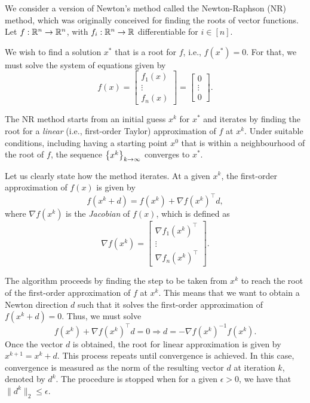 We consider a version of Newton's method called the Newton-Raphson (NR) method, which was originally conceived for finding the roots of vector functions. Let $f: \mathbb{R}^n \to \mathbb{R}^n$, with $f_i : \mathbb{R}^n \to \mathbb{R}$ differentiable for $i \in [n]$.

We wish to find a solution $x^*$ that is a root for $f$, i.e., $f(x^*) = 0$. For that, we must solve the system of equations given by
	$$ 
	f(x) = \begin{bmatrix} f_1(x) \\ \vdots \\ f_n(x) \end{bmatrix} = \begin{bmatrix} 0 \\ \vdots \\ 0 \end{bmatrix}.
	$$
	
The NR method starts from an initial guess $x^k$ for $x^*$ and iterates by finding the root for a \emph{linear} (i.e., first-order Taylor) approximation of $f$ at $x^k$. Under suitable conditions, including having a starting point $x^0$ that is within a neighbourhood of the root of $f$, the sequence $\left\{ x^k \right \}_{k\to\infty}$ converges to $x^*$.

Let us clearly state how the method iterates. At a given $x^k$, the first-order approximation of $f(x)$ is given by
	$$ 
	f(x^k + d) = f(x^k) + \nabla f(x^k)^\top d,
	$$
	where $\nabla f(x^k)$ is the \emph{Jacobian} of $f(x)$, which is defined as
	$$ 
	\nabla f(x^k) = \begin{bmatrix} \nabla f_1(x^k)^\top \\ \vdots \\ \nabla f_n(x^k)^\top \end{bmatrix}. 
	$$
	
The algorithm proceeds by finding the step to be taken from $x^k$ to reach the root of the first-order approximation of $f$ at $x^k$. This means that we want to obtain a Newton direction $d$ such that it solves the first-order approximation of $f(x^k + d) = 0$. Thus, we must solve
	\begin{equation*}
		f(x^k) + \nabla f(x^k)^\top d = 0 \Rightarrow
		d = -\nabla f(x^k)^{-1}f(x^k).
	\end{equation*}
	Once the vector $d$ is obtained, the root for linear approximation is given by $x^{k+1} = x^k + d$. This process repeats until convergence is achieved. In this case, convergence is measured as the norm of the resulting vector $d$ at iteration $k$, denoted by $d^k$. The procedure is stopped when for a given $\epsilon > 0$, we have that $\|d^k\|_2 \leq \epsilon$.
	
